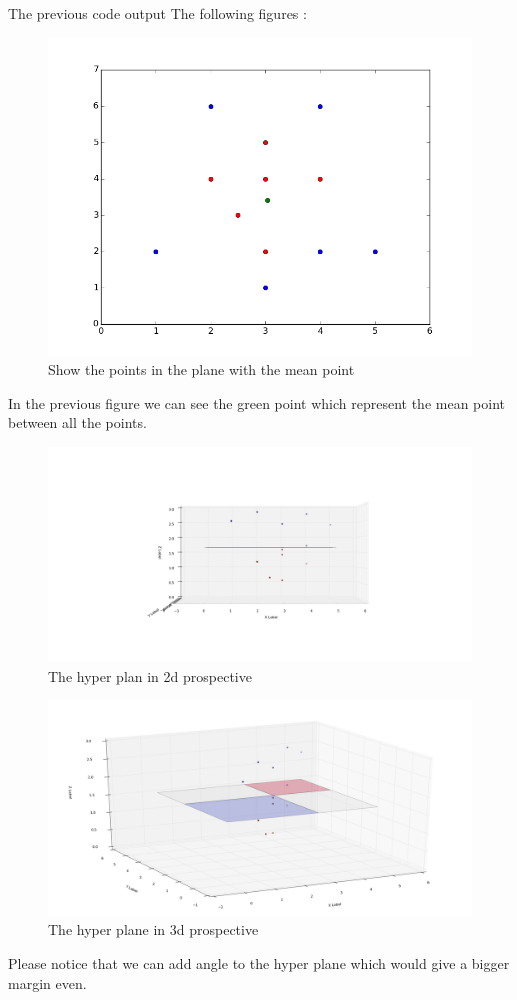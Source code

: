 \documentclass{article}
\begin{document}
The previous code output The following figures : 
\begin{figure}[H]
\includegraphics[scale=0.7]{points.png}
\caption{Show the points in the plane with the mean point}
\end{figure}
In the previous figure we can see the green point which represent the mean point between all the points.
\begin{figure}[H]
\includegraphics[trim={12cm 5cm 12cm 5cm},clip,scale=0.6]{horizntal.png}
\caption{The hyper plan in 2d prospective}
\end{figure}

\begin{figure}[H]
\includegraphics[trim={1cm 0 10cm 2cm},clip,scale=0.4]{3d.png}
\caption{The hyper plane in 3d prospective}
\end{figure}
Please notice that we can add angle to the hyper plane which would give a bigger margin even.
\end{document}
